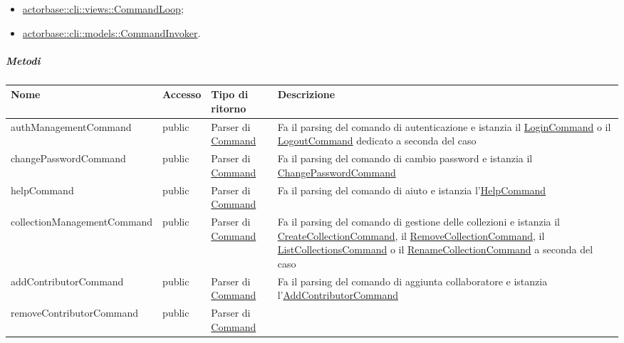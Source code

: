 \documentclass{scalatekids-article}
\begin{document}
\begin{itemize}
\item \hyperref[sec:actorbase::cli::views::CommandLoop]{actorbase::cli::views::CommandLoop};
\item \hyperref[sec:actorbase::cli::models::CommandInvoker]{actorbase::cli::models::CommandInvoker}.
\end{itemize}

\subparagraph{Metodi}

\begin{tabular}{| p{5.5cm} | p{1.5cm} | p{2cm} | p{7.5cm} |} %
  \hline
  Nome & Accesso & Tipo di ritorno & Descrizione\\
  \hline
  authManagementCommand & public & Parser di \hyperref[sec:actorbase::cli::models::Command]{Command} & Fa il parsing del comando di autenticazione e istanzia il \hyperref[sec:actorbase::cli::models::LoginCommand]{LoginCommand} o il \hyperref[sec:actorbase::cli::models::LogoutCommand]{LogoutCommand} dedicato a seconda del caso\\
  \hline
  changePasswordCommand & public & Parser di \hyperref[sec:actorbase::cli::models::Command]{Command} & Fa il parsing del comando di cambio password e istanzia il \hyperref[sec:actorbase::cli::models::ChangePasswordCommand]{ChangePasswordCommand}\\
  \hline
  helpCommand & public & Parser di \hyperref[sec:actorbase::cli::models::Command]{Command} & Fa il parsing del comando di aiuto e istanzia l'\hyperref[sec:actorbase::cli::models::HelpCommand]{HelpCommand}\\
  \hline
  collectionManagementCommand & public & Parser di \hyperref[sec:actorbase::cli::models::Command]{Command} & Fa il parsing del comando di gestione delle collezioni e istanzia il \hyperref[sec:actorbase::cli::models::CreateCollectionCommand]{CreateCollectionCommand}, il \hyperref[sec:actorbase::cli::models::RemoveCollectionCommand]{RemoveCollectionCommand}, il \hyperref[sec:actorbase::cli::models::ListCollectionsCommand]{ListCollectionsCommand} o il \hyperref[sec:actorbase::cli::models::RenameCollectionCommand]{RenameCollectionCommand} a seconda del caso\\
  \hline
  addContributorCommand & public & Parser di \hyperref[sec:actorbase::cli::models::Command]{Command} & Fa il parsing del comando di aggiunta collaboratore e istanzia l'\hyperref[sec:actorbase::cli::models::AddContributorCommand]{AddContributorCommand}\\
  \hline
  removeContributorCommand & public & Parser di \hyperref[sec:actorbase::cli::models::Command]{Command} &

\end{tabular}
\end{document}
